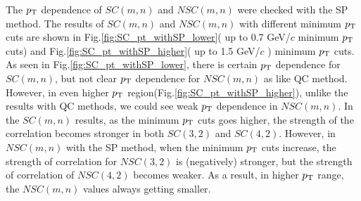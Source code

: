   The $p_{\rm{T}}$ dependence of $SC(m,n)$ and $NSC(m,n)$ were checked with the SP method. The results of $SC(m,n)$ and $NSC(m,n)$ with different minimum $p_{\rm{T}}$ cuts are shown in Fig.\ref{fig:SC_pt_withSP_lower}( up to 0.7 GeV/$c$ minimum $p_{\rm{T}}$ cuts) and Fig.\ref{fig:SC_pt_withSP_higher}( up to 1.5 GeV/$c$ ) minimum $p_{\rm{T}}$ cuts. As seen in Fig.\ref{fig:SC_pt_withSP_lower}, there is certain $p_{\rm{T}}$ dependence for $SC(m,n)$, but not clear $p_{\rm{T}}$ dependence for  $NSC(m,n)$ as like QC method. However, in even higher $p_{\rm{T}}$ region(Fig.\ref{fig:SC_pt_withSP_higher}), unlike the results with QC methods, we could see weak $p_{\rm{T}}$ dependence in  $NSC(m,n)$. In the $SC(m,n)$ results, as the minimum $p_{\rm{T}}$ cuts goes higher, the strength of the correlation becomes stronger in both $SC(3,2)$ and $SC(4,2)$. However, in $NSC(m,n)$ with the SP method, when the minimum $p_{\rm{T}}$ cuts increase, the strength of correlation for $NSC(3,2)$ is (negatively) stronger, but the strength of correlation of $NSC(4,2)$ becomes weaker. As a result, in higher $p_{\rm{T}}$ range, the $NSC(m,n)$ values always getting smaller.


